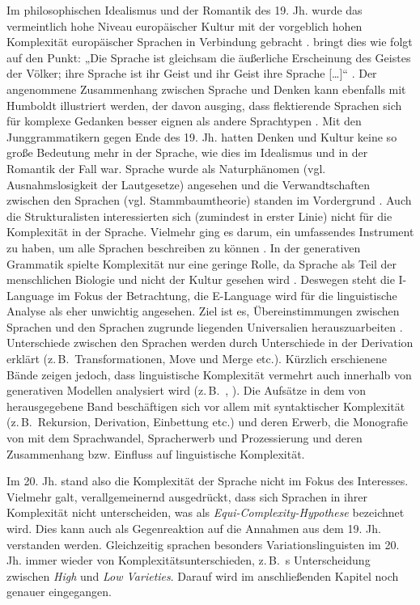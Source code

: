 Im philosophischen Idealismus und der Romantik des 19. Jh. wurde das vermeintlich hohe Niveau europäischer Kultur mit der vorgeblich hohen Komplexität europäischer Sprachen in Verbindung gebracht \citep[2]{Kusters2003}. \citet{Humboldt1836} bringt dies wie folgt auf den Punkt: „Die Sprache ist gleichsam die äußerliche Erscheinung des Geistes der Völker; ihre Sprache ist ihr Geist und ihr Geist ihre Sprache […]“ \citep[53]{Humboldt1836}. Der angenommene Zusammenhang zwischen Sprache und Denken kann ebenfalls mit Humboldt illustriert werden, der davon ausging, dass flektierende Sprachen sich für komplexe Gedanken besser eignen als andere Sprachtypen \citep[3]{Kusters2003}. Mit den Junggrammatikern gegen Ende des 19. Jh. hatten Denken und Kultur keine so große Bedeutung mehr in der Sprache, wie dies im Idealismus und in der Romantik der Fall war. Sprache wurde als Naturphänomen (vgl. Ausnahmslosigkeit der Lautgesetze) angesehen und die Verwandtschaften zwischen den Sprachen (vgl. Stammbaumtheorie) standen im Vordergrund \citep[3]{Kusters2003}. Auch die Strukturalisten interessierten sich (zumindest in erster Linie) nicht für die Komplexität in der Sprache. Vielmehr ging es darum, ein umfassendes Instrument zu haben, um alle Sprachen beschreiben zu können \citep[4]{Kusters2003}. In der generativen Grammatik spielte Komplexität nur eine geringe Rolle, da Sprache als Teil der menschlichen Biologie und nicht der Kultur gesehen wird \citep[6]{Sampson2009}. Deswegen steht die I-Language im Fokus der Betrachtung, die E-Language wird für die linguistische Analyse als eher unwichtig angesehen. Ziel ist es, Übereinstimmungen zwischen Sprachen und den Sprachen zugrunde liegenden Universalien herauszuarbeiten \citep[4]{Kusters2003}. Unterschiede zwischen den Sprachen werden durch Unterschiede in der Derivation erklärt (z.\,B.\ Transformationen, Move und Merge etc.). Kürzlich erschienene Bände zeigen jedoch, dass linguistische Komplexität vermehrt auch innerhalb von generativen Modellen analysiert wird (z.\,B.\ \citealt{Culicover2013}, \citealt{TrotzkeBayer2015}). Die Aufsätze in dem von \citet{TrotzkeBayer2015} herausgegebene Band beschäftigen sich vor allem mit syntaktischer Komplexität (z.\,B.\ Rekursion, Derivation, Einbettung etc.) und deren Erwerb, die Monografie von \citet{Culicover2013} mit dem Sprachwandel, Spracherwerb und Prozessierung und deren Zusammenhang bzw. Einfluss auf linguistische Komplexität.

Im 20. Jh. stand also die Komplexität der Sprache nicht im Fokus des Interesses. Vielmehr galt, verallgemeinernd ausgedrückt, dass sich Sprachen in ihrer Komplexität nicht unterscheiden, was als \textit{Equi-Com\-ple\-xi\-ty-Hy\-po\-the\-se} bezeichnet wird. Dies kann auch als Gegenreaktion auf die Annahmen aus dem 19. Jh. verstanden werden. Gleichzeitig sprachen besonders Variationslinguisten im 20. Jh. immer wieder von Komplexitätsunterschieden, z.\,B.\ \citeauthor{Ferguson1959}s \citeyearpar{Ferguson1959} Unterscheidung zwischen \textit{High} und \textit{Low Varieties}. Darauf wird im anschließenden Kapitel noch genauer eingegangen.

